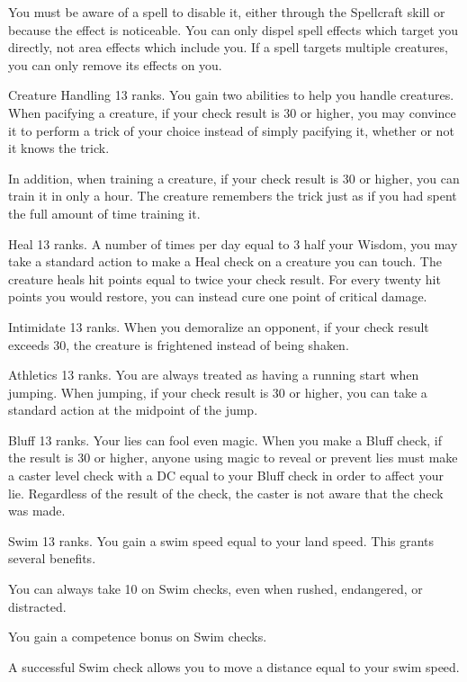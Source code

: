 You must be aware of a spell to disable it, either through the Spellcraft skill or because the effect is noticeable. You can only dispel spell effects which target you directly, not area effects which include you. If a spell targets multiple creatures, you can only remove its effects on you.

\featpre Creature Handling 13 ranks.
\featben You gain two abilities to help you handle creatures. When pacifying a creature, if your check result is 30 or higher, you may convince it to perform a trick of your choice instead of simply pacifying it, whether or not it knows the trick.

In addition, when training a creature, if your check result is 30 or higher, you can train it in only a hour. The creature remembers the trick just as if you had spent the full amount of time training it.

\featpre Heal 13 ranks.
\featben A number of times per day equal to 3 \add half your Wisdom, you may take a standard action to make a Heal check on a creature you can touch. The creature heals hit points equal to twice your check result. For every twenty hit points you would restore, you can instead cure one point of critical damage.

\featpre Intimidate 13 ranks.
\featben When you demoralize an opponent, if your check result exceeds 30, the creature is frightened instead of being shaken.

\featpre Athletics 13 ranks.
\featben You are always treated as having a running start when jumping. When jumping, if your check result is 30 or higher, you can take a standard action at the midpoint of the jump.

\featpre Bluff 13 ranks.
\featben Your lies can fool even magic. When you make a Bluff check, if the result is 30 or higher, anyone using magic to reveal or prevent lies must make a caster level check with a DC equal to your Bluff check in order to affect your lie. Regardless of the result of the check, the caster is not aware that the check was made.

\featpre Swim 13 ranks.
\featben You gain a swim speed equal to your land speed. This grants several benefits.
\begin{itemize*}
  \item You can always take 10 on Swim checks, even when rushed, endangered, or distracted. 
  \item You gain a  competence bonus on Swim checks.
  \item A successful Swim check allows you to move a distance equal to your swim speed.
\end{itemize*}


